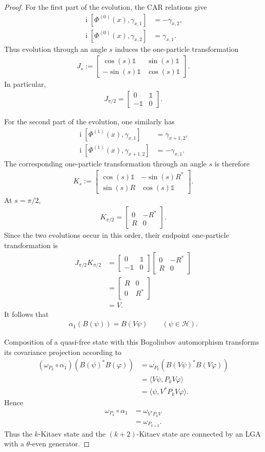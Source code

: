 \documentclass[a4paper,10pt]{article}
\numberwithin{equation}{section}
\theoremstyle{plain}
\theoremstyle{plain}
\theoremstyle{plain}
\theoremstyle{plain}
\theoremstyle{plain}
\theoremstyle{remark}
\theoremstyle{definition}
\newcommand{\ii}{\operatorname{i}}
\newcommand{\calH}{\mathcal{H}}
\newcommand{\Id}{\mathds{1}}
\newcommand{\eq}[1]{\begin{align*}#1\end{align*}}
\newcommand{\br}[1]{\left(#1\right)}
\begin{document}
\begin{proof}
For the first part of the evolution, the CAR relations give
\eq{
\ii
\left[
\Phi^{(0)}(x),
\gamma_{x,1}
\right]
&=
-\gamma_{x,2},\\
\ii
\left[
\Phi^{(0)}(x),
\gamma_{x,2}
\right]
&=
\gamma_{x,1}.
}
Thus evolution through an angle $s$ induces the one-particle
transformation
\eq{
J_s
:=
\begin{bmatrix}
\cos(s)\Id
&
\sin(s)\Id
\\
-\sin(s)\Id
&
\cos(s)\Id
\end{bmatrix}.
}
In particular,
\eq{
J_{\pi/2}
=
\begin{bmatrix}
0 & \Id\\
-\Id & 0
\end{bmatrix}.
}

For the second part of the evolution, one similarly has
\eq{
\ii
\left[
\Phi^{(1)}(x),
\gamma_{x,1}
\right]
&=
\gamma_{x+1,2},\\
\ii
\left[
\Phi^{(1)}(x),
\gamma_{x+1,2}
\right]
&=
-\gamma_{x,1}.
}
The corresponding one-particle transformation through an angle $s$ is
therefore
\eq{
K_s
:=
\begin{bmatrix}
\cos(s)\Id
&
-\sin(s)R^\ast
\\
\sin(s)R
&
\cos(s)\Id
\end{bmatrix}.
}
At $s=\pi/2$,
\eq{
K_{\pi/2}
=
\begin{bmatrix}
0 & -R^\ast\\
R & 0
\end{bmatrix}.
}
Since the two evolutions occur in this order, their endpoint
one-particle transformation is
\eq{
J_{\pi/2}K_{\pi/2}
&=
\begin{bmatrix}
0 & \Id\\
-\Id & 0
\end{bmatrix}
\begin{bmatrix}
0 & -R^\ast\\
R & 0
\end{bmatrix}\\
&=
\begin{bmatrix}
R & 0\\
0 & R^\ast
\end{bmatrix}\\
&=
V.
}
It follows that
\eq{
\alpha_1\br{B(\psi)}
=
B(V\psi)
\qquad
\br{
\psi\in\calH
}.
}

Composition of a quasi-free state with this Bogoliubov automorphism
transforms its covariance projection according to
\eq{
\br{
\omega_{P_k}\circ\alpha_1
}
\br{
B(\psi)^\ast B(\varphi)
}
&=
\omega_{P_k}
\br{
B(V\psi)^\ast B(V\varphi)
}\\
&=
\langle
V\psi,
P_kV\varphi
\rangle\\
&=
\langle
\psi,
V^\ast P_kV\varphi
\rangle.
}
Hence
\eq{
\omega_{P_k}\circ\alpha_1
&=
\omega_{V^\ast P_kV}\\
&=
\omega_{P_{k+2}}.
}
Thus the $k$-Kitaev state and the $(k+2)$-Kitaev state are connected by
an LGA with a $\theta$-even generator.


\end{proof}
\end{document}

